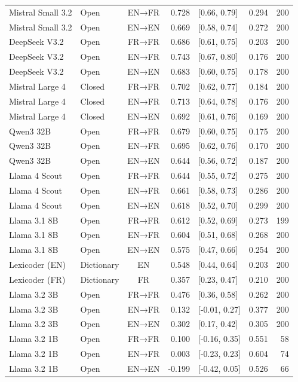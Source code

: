 \begin{tabular}{llcrlrr}
Mistral Small 3.2 & Open & EN→FR & 0.728 & [0.66, 0.79] & 0.294 & 200 \\
Mistral Small 3.2 & Open & EN→EN & 0.669 & [0.58, 0.74] & 0.272 & 200 \\
DeepSeek V3.2 & Open & FR→FR & 0.686 & [0.61, 0.75] & 0.203 & 200 \\
DeepSeek V3.2 & Open & EN→FR & 0.743 & [0.67, 0.80] & 0.176 & 200 \\
DeepSeek V3.2 & Open & EN→EN & 0.683 & [0.60, 0.75] & 0.178 & 200 \\
Mistral Large 4 & Closed & FR→FR & 0.702 & [0.62, 0.77] & 0.184 & 200 \\
Mistral Large 4 & Closed & EN→FR & 0.713 & [0.64, 0.78] & 0.176 & 200 \\
Mistral Large 4 & Closed & EN→EN & 0.692 & [0.61, 0.76] & 0.169 & 200 \\
Qwen3 32B & Open & FR→FR & 0.679 & [0.60, 0.75] & 0.175 & 200 \\
Qwen3 32B & Open & EN→FR & 0.695 & [0.62, 0.76] & 0.170 & 200 \\
Qwen3 32B & Open & EN→EN & 0.644 & [0.56, 0.72] & 0.187 & 200 \\
Llama 4 Scout & Open & FR→FR & 0.644 & [0.55, 0.72] & 0.275 & 200 \\
Llama 4 Scout & Open & EN→FR & 0.661 & [0.58, 0.73] & 0.286 & 200 \\
Llama 4 Scout & Open & EN→EN & 0.618 & [0.52, 0.70] & 0.299 & 200 \\
Llama 3.1 8B & Open & FR→FR & 0.612 & [0.52, 0.69] & 0.273 & 199 \\
Llama 3.1 8B & Open & EN→FR & 0.604 & [0.51, 0.68] & 0.268 & 200 \\
Llama 3.1 8B & Open & EN→EN & 0.575 & [0.47, 0.66] & 0.254 & 200 \\
Lexicoder (EN) & Dictionary & EN & 0.548 & [0.44, 0.64] & 0.203 & 200 \\
Lexicoder (FR) & Dictionary & FR & 0.357 & [0.23, 0.47] & 0.210 & 200 \\
Llama 3.2 3B & Open & FR→FR & 0.476 & [0.36, 0.58] & 0.262 & 200 \\
Llama 3.2 3B & Open & EN→FR & 0.132 & [-0.01, 0.27] & 0.377 & 200 \\
Llama 3.2 3B & Open & EN→EN & 0.302 & [0.17, 0.42] & 0.305 & 200 \\
Llama 3.2 1B & Open & FR→FR & 0.100 & [-0.16, 0.35] & 0.551 & 58 \\
Llama 3.2 1B & Open & EN→FR & 0.003 & [-0.23, 0.23] & 0.604 & 74 \\
Llama 3.2 1B & Open & EN→EN & -0.199 & [-0.42, 0.05] & 0.526 & 66 \\
\hline
\end{tabular}
